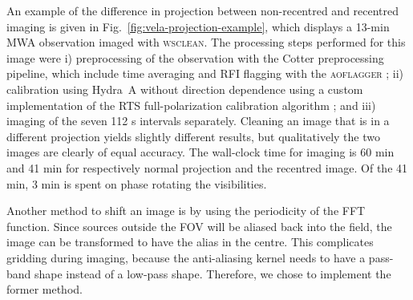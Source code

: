 \documentclass[useAMS,usenatbib]{mn2e}
\begin{document}
An example of the difference in projection between non-recentred and recentred imaging is given in Fig.~\ref{fig:vela-projection-example}, which displays a 13-min MWA observation imaged with \textsc{wsclean}. The processing steps performed for this image were i) preprocessing of the observation with the Cotter preprocessing pipeline, which include time averaging and RFI flagging with the \textsc{aoflagger} \citep{post-correlation-rfi-classification,scale-invariant-rank-operator}; ii) calibration using Hydra~A without direction dependence using a custom implementation of the RTS full-polarization calibration algorithm \citep{rts-mwa}; and iii) imaging of the seven 112 s intervals separately. Cleaning an image that is in a different projection yields slightly different results, but qualitatively the two images are clearly of equal accuracy. The wall-clock time for imaging is 60 min and 41 min for respectively normal projection and the recentred image. Of the 41 min, 3 min is spent on phase rotating the visibilities.

Another method to shift an image is by using the periodicity of the FFT function. Since sources outside the FOV will be aliased back into the field, the image can be transformed to have the alias in the centre. This complicates gridding during imaging, because the anti-aliasing kernel needs to have a pass-band shape instead of a low-pass shape. Therefore, we chose to implement the former method.
\end{document}
